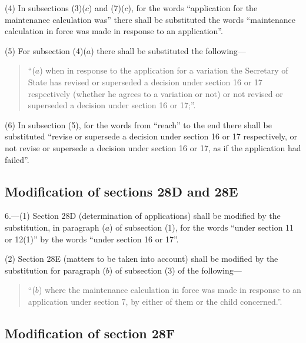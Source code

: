 \documentclass[12pt,a4paper]{article}
\begin{document}
(4) In subsections (3)($c$)  and (7)($c$), for the words “application for the maintenance calculation was” there shall be substituted the words “maintenance calculation in force was made in response to an application”.

(5) For subsection (4)($a$)  there shall be substituted the following—
\begin{quotation}
“($a$) when in response to the application for a variation the Secretary of State has revised or superseded a decision under section 16 or 17 respectively (whether he agrees to a variation or not) or not revised or superseded a decision under section 16 or 17;”.
\end{quotation}

(6) In subsection (5), for the words from “reach” to the end there shall be substituted “revise or supersede a decision under section 16 or 17 respectively, or not revise or supersede a decision under section 16 or 17, as if the application had failed”.

\subsection[6. Modification of sections 28D and 28E]{Modification of sections 28D and 28E}

6.---(1)  Section 28D (determination of applications) shall be modified by the substitution, in paragraph ($a$)  of subsection (1), for the words “under section 11 or 12(1)” by the words “under section 16 or 17”.

(2) Section 28E (matters to be taken into account) shall be modified by the substitution for paragraph ($b$)  of subsection (3) of the following—
\begin{quotation}
“($b$) where the maintenance calculation in force was made in response to an application under section 7, by either of them or the child concerned.”.
\end{quotation}

\subsection[7. Modification of section 28F]{Modification of section 28F}
\end{document}
